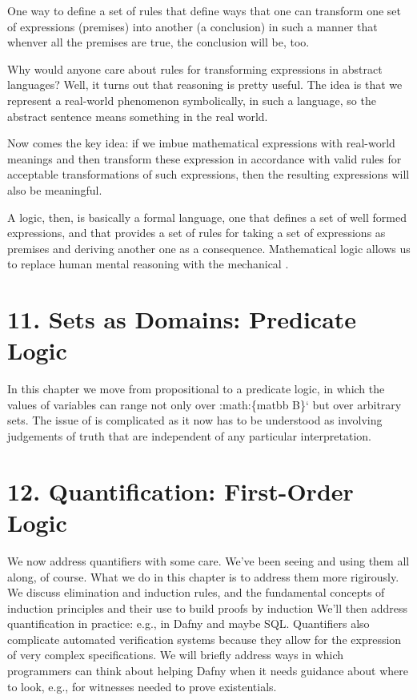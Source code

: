 \documentclass[letterpaper,10pt,english]{sphinxmanual}
\begin{document}
One way to define a set of  rules that define ways that one
can transform one set of expressions (premises) into another (a
conclusion) in such a manner that whenver all the premises are true,
the conclusion will be, too.

Why would anyone care about rules for transforming expressions in
abstract languages? Well, it turns out that  reasoning is
pretty useful. The idea is that we represent a real-world phenomenon
symbolically, in such a language, so the abstract sentence means
something in the real world.

Now comes the key idea: if we imbue mathematical expressions with
real-world meanings and then transform these expression in accordance
with valid rules for acceptable transformations of such expressions,
then the resulting expressions will also be meaningful.

A logic, then, is basically a formal language, one that defines a set
of well formed expressions, and that provides a set of 
rules for taking a set of expressions as premises and deriving another
one as a consequence. Mathematical logic allows us to replace human
mental reasoning with the mechanical .


\chapter{11. Sets as Domains: Predicate Logic}
\label{\detokenize{11-predicate-logic::doc}}\label{\detokenize{11-predicate-logic:sets-as-domains-predicate-logic}}
In this chapter we move from propositional to a predicate logic, in
which the values of variables can range not only over :math:\{matbb
B\}{}` but over arbitrary sets. The issue of  is complicated as
it now has to be understood as involving judgements of truth that are
independent of any particular interpretation.


\chapter{12. Quantification: First-Order Logic}
\label{\detokenize{12-quantification::doc}}\label{\detokenize{12-quantification:quantification-first-order-logic}}
We now address quantifiers with some care.  We’ve been seeing and
using them all along, of course. What we do in this chapter is to
address them more rigirously. We discuss elimination and induction
rules, and the fundamental concepts of induction principles and their
use to build proofs by induction We’ll then address quantification in
practice: e.g., in Dafny and maybe SQL. Quantifiers also complicate
automated verification systems because they allow for the expression
of very complex specifications. We will briefly address ways in which
programmers can think about helping Dafny when it needs guidance about
where to look, e.g., for witnesses needed to prove existentials.
\end{document}
